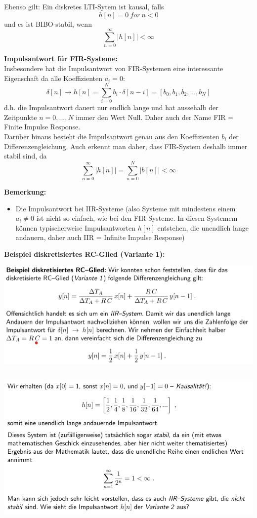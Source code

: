 \documentclass[12pt,a4paper]{scrartcl}
\begin{document}
  \noindent Ebenso gilt: Ein diskretes LTI-Sytem ist kausal, falls 
  $$ h[n] = 0\ for\ n<0$$
  und es ist BIBO-stabil, wenn
  $$ \sum_{n=0}^{\infty}|h[n]| < \infty$$

  \noindent \textbf{Impulsantwort für FIR-Systeme:} \\
  \noindent Insbesondere hat die Impulsantwort von FIR-Systemen eine interessante Eigenschaft da alle Koeffizienten $a_i = 0$:
  $$ \delta[n] \to h[n] = \sum_{i=0}^{N} b_i \cdot \delta[n-i] = [b_0, b_1, b_2,...,b_N]$$
  d.h. die Impulsantwort dauert nur endlich lange und hat aussehalb der Zeitpunkte $n = 0,...,N$ immer den Wert Null. Daher auch der Name FIR = Finite Impulse Response. \\

  \noindent  Darüber hinaus besteht die Impulsantwort genau aus den Koeffizienten $b_i$ der Differenzengleichung. Auch erkennt man daher, dass FIR-System deshalb immer stabil sind, da
  $$ \sum_{n=0}^{\infty}|h[n]| = \sum_{n=0}^{N}|b[n]| < \infty$$

  \noindent \textbf{Bemerkung:}
  \begin{itemize}
    \item Die Impulsantwort bei IIR-Systeme (also Systeme mit mindestens einem $a_i \neq 0$ ist nicht so einfach, wie bei den FIR-Systeme. In diesen Systemem können typischerweise Impulsantworten $h[n]$ entstehen, die unendlich lange andauern, daher auch IIR = Infinite Impulse Response) 
  \end{itemize} 

  \noindent \textbf{Beispiel diskretisiertes RC-Glied (Variante 1):} \\
  \includegraphics[height=6cm]{Pictures/bsprc.png} \\
  \includegraphics[height=8cm]{Pictures/bsprc2.png} \\
\end{document}
